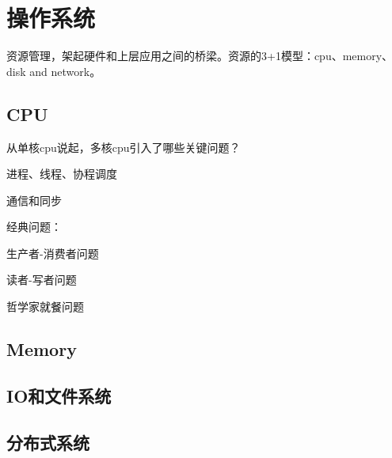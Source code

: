 \chapter{操作系统}

资源管理，架起硬件和上层应用之间的桥梁。资源的3+1模型：cpu、memory、disk and network。

\section{CPU}

从单核cpu说起，多核cpu引入了哪些关键问题？

进程、线程、协程调度

通信和同步

经典问题：
\begin{compactenum}
\item 生产者-消费者问题
\item 读者-写者问题
\item 哲学家就餐问题
\end{compactenum}

\section{Memory}

\section{IO和文件系统}

\section{分布式系统}
